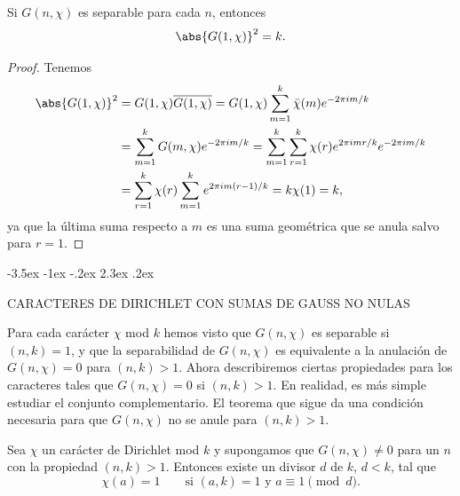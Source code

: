 \documentclass[12pt,a4paper]{book}
\makeatletter
\renewcommand\section{\@startsection{section}{1}{\z@}%
  {-3.5ex \@plus -1ex \@minus -.2ex}%
  {2.3ex \@plus .2ex}%
  {\normalfont\Large\bfseries\raggedright}}
\makeatother
\begin{document}
    \begin{teorema}
        Si $G(n,\chi)$ es separable para cada $n$, entonces
        \begin{equation}\label{eq:8-13}
            \abs{G(1,\chi)}^{2}=k.
        \end{equation}
    \end{teorema}

    \begin{proof}
        Tenemos
        \begin{align*}
            \abs{G(1,\chi)}^{2}&=G(1,\chi)\overline{G(1,\chi)}=G(1,\chi)\sum_{m=1}^{k}\bar{\chi}(m)e^{-2\pi im/k}\\
            &=\sum_{m=1}^{k}G(m,\chi)e^{-2\pi im/k}=\sum_{m=1}^{k}\sum_{r=1}^{k}\chi(r)e^{2\pi imr/k}e^{-2\pi im/k}\\
            &=\sum_{r=1}^{k}\chi(r)\sum_{m=1}^{k}e^{2\pi im(r-1)/k}=k\chi(1)=k,
        \end{align*}
        ya que la última suma respecto a $m$ es una suma geométrica que se anula salvo para
        $r=1$.
    \end{proof}

    \section{CARACTERES DE DIRICHLET CON SUMAS DE GAUSS NO NULAS}

    Para cada carácter $\chi$ mod $k$ hemos visto que $G(n,\chi)$ es separable si
    $(n,k)=1$, y que la separabilidad de $G(n,\chi)$ es equivalente a la anulación de
    $G(n,\chi)=0$ para $(n,k)>1$. Ahora describiremos ciertas propiedades para los
    caracteres tales que $G(n,\chi)=0$ si $(n,k)>1$. En realidad, es más simple estudiar el
    conjunto complementario. El teorema que sigue da una condición necesaria para que
    $G(n,\chi)$ no se anule para $(n,k)>1$.

    \begin{teorema}
        Sea $\chi$ un carácter de Dirichlet mod $k$ y supongamos que $G(n,\chi)\neq0$ para
        un $n$ con la propiedad $(n,k)>1$. Entonces existe un divisor $d$ de $k$, $d<k$,
        tal que
        \begin{equation}\label{eq:8-14}
            \chi(a)=1\qquad\text{si }(a,k)=1\text{ y }a\equiv1\pmod{d}.
        \end{equation}
    \end{teorema}
\end{document}
